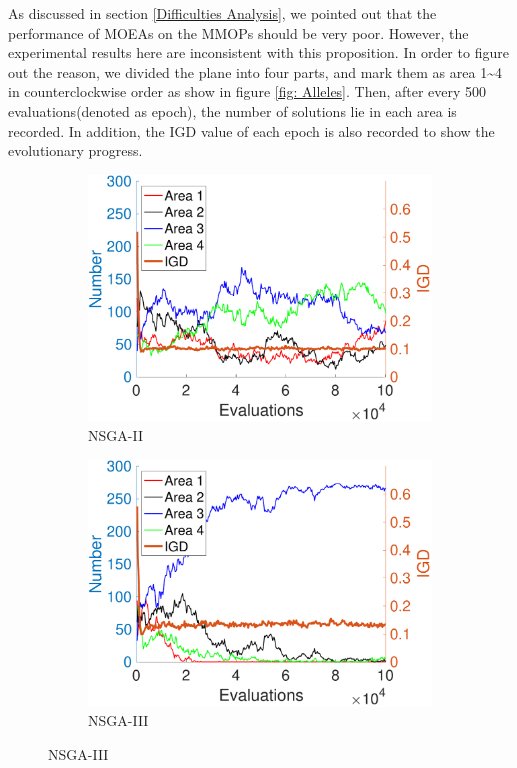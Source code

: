 \documentclass[conference]{IEEEtran}
\begin{document}
As discussed in section \ref{Difficulties Analysis}, we pointed out that the performance of MOEAs on the MMOPs should be very poor. However, the experimental results here are inconsistent with this proposition. In order to figure out the reason, we divided the plane into four parts, and mark them as area 1\textasciitilde 4 in counterclockwise order as show in figure \ref{fig: Alleles}. Then, after every 500 evaluations(denoted as epoch), the number of solutions lie in each area is recorded. In addition, the IGD value of each epoch is also recorded to show the evolutionary progress. 

\begin{figure}[htbp]
    \centering
    \begin{subfigure}[b]{.22\textwidth}
    \includegraphics[width=\linewidth]{Section5/dim2/Diversity/NSGAII}
    \caption{NSGA-II}
    \end{subfigure}
    \begin{subfigure}[b]{.22\textwidth}
    \includegraphics[width=\linewidth]{Section5/dim2/Diversity/NSGAIII}
    \caption{NSGA-III}
    \label{fig: NSGA-III Diversity dim=2}
    \end{subfigure}
    

\end{figure}
\end{document}

